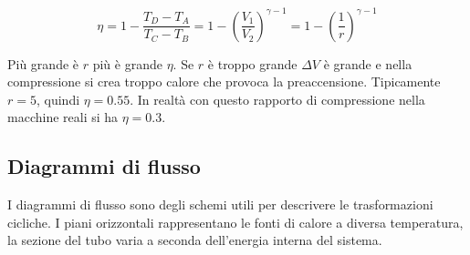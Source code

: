 \begin{equation*}\eta=1-\frac{T_D-T_A}{T_C-T_B}=1-\left(\frac{V_1}{V_2}\right)^{\gamma-1}\!\!\!\!\!\!\!\!\! =1-\left(\frac{1}{r}\right)^{\gamma-1}\end{equation*}

Più grande è $r$ più è grande $\eta$. Se $r$ è troppo grande $\Delta V$ è grande e nella compressione si crea troppo calore che provoca la preaccensione. Tipicamente $r=5$, quindi $\eta=0.55$. In realtà con questo rapporto di compressione nella macchine reali si ha $\eta=0.3$.

\subsection{Diagrammi di flusso}
I diagrammi di flusso sono degli schemi utili per descrivere le trasformazioni cicliche. I piani orizzontali rappresentano le fonti di calore a diversa temperatura, la sezione del tubo varia a seconda dell'energia interna del sistema.

